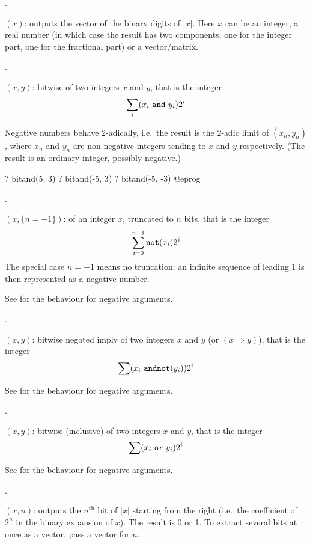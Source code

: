 .

$(x)$: outputs the vector of the binary digits of $|x|$.
Here $x$ can be an integer, a real number (in which case the result has two
components, one for the integer part, one for the fractional part) or a
vector/matrix.

.

$(x,y)$:\label{se:bitand} bitwise 
of two integers $x$ and $y$, that is the integer
$$\sum_i (x_i~{\tt and}~y_i) 2^i$$

Negative numbers behave $2$-adically, i.e.~the result is the $2$-adic limit
of $(x_n,y_n)$, where $x_n$ and $y_n$ are non-negative integers
tending to $x$ and $y$ respectively. (The result is an ordinary integer,
possibly negative.)

\bprog
? bitand(5, 3)
? bitand(-5, 3)
? bitand(-5, -3)
@eprog

.

$(x,\{n=-1\})$:  of an integer $x$,
truncated to $n$ bits, that is the integer $$\sum_{i=0}^{n-1} {\tt not}(x_i)
2^i$$ The special case $n=-1$ means no truncation: an infinite sequence of
leading $1$ is then represented as a negative number.

See  for the behaviour for negative arguments.

.

$(x,y)$: bitwise negated imply of two integers $x$ and
$y$ (or  $(x \Rightarrow y)$), that is the integer $$\sum
(x_i~{\tt and not}(y_i)) 2^i$$

See  for the behaviour for negative arguments.

.

$(x,y)$: bitwise (inclusive)
 of two integers $x$ and $y$, that is the integer $$\sum
(x_i~{\tt or}~y_i) 2^i$$

See  for the behaviour for negative arguments.

.

$(x,n)$: outputs the $n^{\text{th}}$ bit of $|x|$ starting
from the right (i.e.~the coefficient of $2^n$ in the binary expansion of
$x$). The result is 0 or 1. To extract several bits at once as a vector, pass
a vector for $n$.

